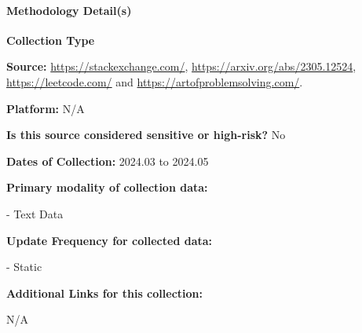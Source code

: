 \paragraph{Methodology Detail(s)}
\textbf{Collection Type}

\textbf{Source:} \url{https://stackexchange.com/}, \url{https://arxiv.org/abs/2305.12524}, \url{https://leetcode.com/} and \url{https://artofproblemsolving.com/}.

\textbf{Platform:} N/A

\textbf{Is this source considered sensitive or high-risk?} No

\textbf{Dates of Collection:} 2024.03 to 2024.05

\textbf{Primary modality of collection data:}


- Text Data

\textbf{Update Frequency for collected data:}


- Static

\textbf{Additional Links for this collection:}

N/A

